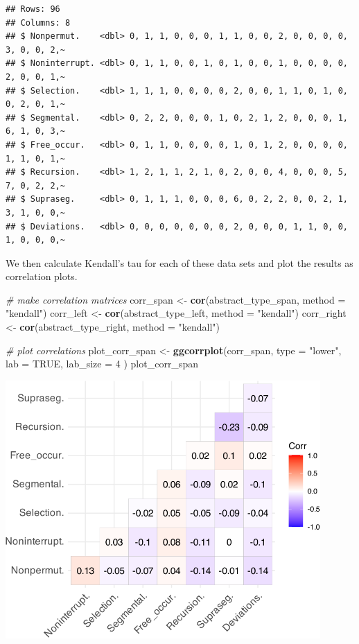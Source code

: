 \documentclass[
]{article}
\newenvironment{Shaded}{\begin{snugshade}}{\end{snugshade}}
\newcommand{\AttributeTok}[1]{\textcolor[rgb]{0.13,0.29,0.53}{#1}}
\newcommand{\CommentTok}[1]{\textcolor[rgb]{0.56,0.35,0.01}{\textit{#1}}}
\newcommand{\ConstantTok}[1]{\textcolor[rgb]{0.56,0.35,0.01}{#1}}
\newcommand{\DecValTok}[1]{\textcolor[rgb]{0.00,0.00,0.81}{#1}}
\newcommand{\FunctionTok}[1]{\textcolor[rgb]{0.13,0.29,0.53}{\textbf{#1}}}
\newcommand{\NormalTok}[1]{#1}
\newcommand{\OtherTok}[1]{\textcolor[rgb]{0.56,0.35,0.01}{#1}}
\newcommand{\StringTok}[1]{\textcolor[rgb]{0.31,0.60,0.02}{#1}}
\begin{document}
\begin{verbatim}
## Rows: 96
## Columns: 8
## $ Nonpermut.    <dbl> 0, 1, 1, 0, 0, 0, 1, 1, 0, 0, 2, 0, 0, 0, 0, 3, 0, 0, 2,~
## $ Noninterrupt. <dbl> 0, 1, 1, 0, 0, 1, 0, 1, 0, 0, 1, 0, 0, 0, 0, 2, 0, 0, 1,~
## $ Selection.    <dbl> 1, 1, 1, 0, 0, 0, 0, 2, 0, 0, 1, 1, 0, 1, 0, 0, 2, 0, 1,~
## $ Segmental.    <dbl> 0, 2, 2, 0, 0, 0, 1, 0, 2, 1, 2, 0, 0, 0, 1, 6, 1, 0, 3,~
## $ Free_occur.   <dbl> 0, 1, 1, 0, 0, 0, 0, 1, 0, 1, 2, 0, 0, 0, 0, 1, 1, 0, 1,~
## $ Recursion.    <dbl> 1, 2, 1, 1, 2, 1, 0, 2, 0, 0, 4, 0, 0, 0, 5, 7, 0, 2, 2,~
## $ Supraseg.     <dbl> 0, 1, 1, 1, 0, 0, 0, 6, 0, 2, 2, 0, 0, 2, 1, 3, 1, 0, 0,~
## $ Deviations.   <dbl> 0, 0, 0, 0, 0, 0, 0, 2, 0, 0, 0, 1, 1, 0, 0, 1, 0, 0, 0,~
\end{verbatim}

We then calculate Kendall's tau for each of these data sets and plot the
results as correlation plots.

\begin{Shaded}
\begin{Highlighting}[]
\CommentTok{\# make correlation matrices}
\NormalTok{corr\_span }\OtherTok{\textless{}{-}} \FunctionTok{cor}\NormalTok{(abstract\_type\_span, }\AttributeTok{method =} \StringTok{"kendall"}\NormalTok{)}
\NormalTok{corr\_left }\OtherTok{\textless{}{-}} \FunctionTok{cor}\NormalTok{(abstract\_type\_left, }\AttributeTok{method =} \StringTok{"kendall"}\NormalTok{)}
\NormalTok{corr\_right }\OtherTok{\textless{}{-}} \FunctionTok{cor}\NormalTok{(abstract\_type\_right, }\AttributeTok{method =} \StringTok{"kendall"}\NormalTok{)}

\CommentTok{\# plot correlations}
\NormalTok{plot\_corr\_span }\OtherTok{\textless{}{-}} \FunctionTok{ggcorrplot}\NormalTok{(corr\_span,}
  \AttributeTok{type =} \StringTok{"lower"}\NormalTok{,}
  \AttributeTok{lab =} \ConstantTok{TRUE}\NormalTok{,}
  \AttributeTok{lab\_size =} \DecValTok{4}
\NormalTok{)}
\NormalTok{plot\_corr\_span}
\end{Highlighting}
\end{Shaded}

\begin{center}\includegraphics[width=0.9\textwidth,height=\textheight]{02_analyses_chapter17_files/figure-latex/corr plots-1} \end{center}
\end{document}
